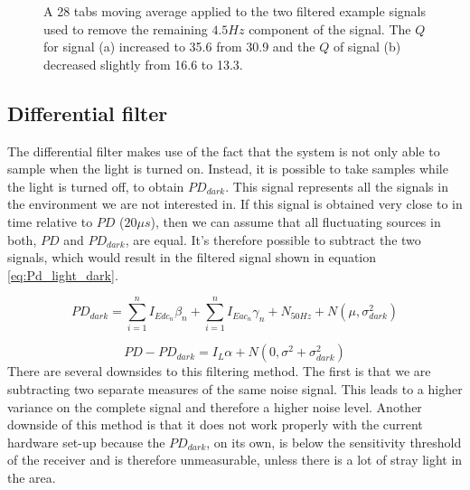 \begin{figure}
	\centering     %
	\caption{A 28 tabs moving average applied to the two filtered example signals used to remove the remaining $4.5 Hz$ component of the signal. The $Q$ for signal (a) increased to 35.6 from 30.9 and the $Q$ of signal (b) decreased slightly from 16.6 to 13.3.\label{movavg_example}}
\end{figure}

\subsection{Differential filter}
The differential filter makes use of the fact that the system is not only able to sample when the light is turned on. Instead, it is possible to take samples while the light is turned off, to obtain $PD_{dark}$. This signal represents all the signals in the environment we are not interested in. If this signal is obtained very close to in time relative to $PD$ ($20\mu s$), then we can assume that all fluctuating sources in both, $PD$ and $PD_{dark}$, are equal. It's therefore possible to subtract the two signals, which would result in the filtered signal shown in equation \ref{eq:Pd_light_dark}.

\begin{equation}
\label{eq:Pd_dark}
PD_{dark} = \sum_{i=1}^n I_{Edc_{n}} \beta_{n} + \sum_{i=1}^n I_{Eac{_n}} \gamma_{n} + N_{50Hz} + N(\mu,\sigma^2_{dark})
\end{equation}

\begin{equation}
\label{eq:Pd_light_dark}
PD - PD_{dark} = I_{L} \alpha + N(0,\sigma^2 + \sigma^2_{dark})
\end{equation}
There are several downsides to this filtering method. The first is that we are subtracting two separate measures of the same noise signal. This leads to a higher variance on the complete signal and therefore a higher noise level. Another downside of this method is that it does not work properly with the current hardware set-up because the $PD_{dark}$, on its own, is below the sensitivity threshold of the receiver and is therefore unmeasurable, unless there is a lot of stray light in the area.

